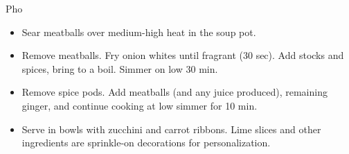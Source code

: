 \begin{recipe}{Pho}
\begin{itemize}[nosep]
  \item Sear meatballs over medium-high heat in the soup pot.

  \item Remove meatballs. Fry onion whites until fragrant (30 sec). Add
    stocks and spices, bring to a boil. Simmer on low 30 min.

  \item Remove spice pods. Add meatballs (and any juice produced),
    remaining ginger, and continue cooking at low simmer for 10 min.

  \item Serve in bowls with zucchini and carrot ribbons. Lime slices and
    other ingredients are sprinkle-on decorations for personalization.
  \end{itemize}
\end{recipe}

